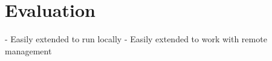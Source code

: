 \chapter{Evaluation} %
\label{cha:evaluation}
- Easily extended to run locally
- Easily extended to work with remote management
